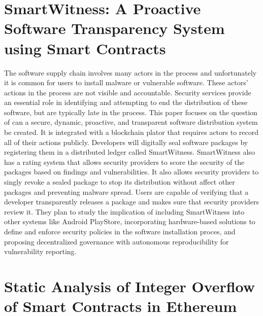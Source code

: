 \documentclass{article}
\begin{document}
\section{SmartWitness: A Proactive Software Transparency System using Smart Contracts\cite{Smart}}

The software supply chain involves many actors in  the process and unfortunately it is common for users to install malware or vulnerable software. These actors' actions in the process are not visible and accountable. Security services provide an essential role in identifying and attempting to end the distribution of these software, but are typically late in the process. This paper focuses on the question of can a secure, dynamic, proactive, and transparent software distribution system be created. It is integrated with a blockchain plator that requires actors to record all of their actions publicly. Developers will digitally seal software packages by registering them in a distributed ledger called SmartWitness. SmartWitness also has a rating system that allows security providers to score the security of the packages based on findings and vulnerabilities. It also allows security providers to singly revoke a sealed package to stop its distribution without affect other packages and preventing malware spread. Users are capable of verifying that a developer transparently releases a package and makes sure that security providers review it. They plan to study the implication of including SmartWitness into other systems like Android PlayStore, incorporating hardware-based solutions to define and enforce security policies in the software installation proces, and proposing decentralized governance with autonomous reproducibility for vulnerability reporting. 

\section{Static Analysis of Integer Overflow of Smart Contracts in Ethereum \cite{Static}}
\end{document}
